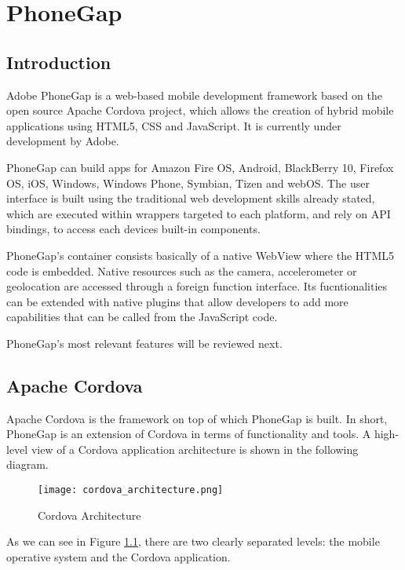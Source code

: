 \chapter{PhoneGap}
\label{ch:phonegap}
\justifying
\section{Introduction}

Adobe PhoneGap is a web-based mobile development framework based on the open source Apache Cordova\cite{apachecordova} project, which allows the creation of hybrid mobile applications using HTML5, CSS and JavaScript. It is currently under development by Adobe.

PhoneGap can build apps for Amazon Fire OS, Android, BlackBerry 10, Firefox OS, iOS, Windows, Windows Phone, Symbian, Tizen and webOS. The user interface is built using the traditional web development skills already stated, which are executed within wrappers targeted to each platform, and rely on API bindings, to access each devices built-in components. 

PhoneGap's container consists basically of a native WebView where the HTML5 code is embedded. Native resources such as the camera, accelerometer or geolocation are accessed through a foreign function interface. Its fucntionalities can be extended with native plugins that allow developers to add more capabilities that can be called from the JavaScript code.

PhoneGap's most relevant features will be reviewed next.

\section{Apache Cordova}

Apache Cordova is the framework on top of which PhoneGap is built. In short, PhoneGap is an extension of Cordova in terms of functionality and tools. A high-level view of a Cordova application architecture is shown in the following diagram.

\begin{figure}[H]
	\centering
	\texttt{[image: cordova\_architecture.png]}
	\caption{Cordova Architecture\label{fig:cordarch}}
\end{figure}

As we can see in Figure \ref{fig:cordarch}, there are two clearly separated levels: the mobile operative system and the Cordova application. 

